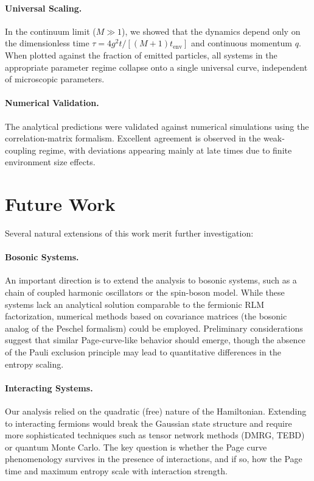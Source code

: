 \documentclass[12pt,oneside,openright]{report}
\theoremstyle{definition}
\theoremstyle{plain}
\theoremstyle{remark}
\begin{document}
\paragraph{Universal Scaling.}
In the continuum limit ($M \gg 1$), we showed that the dynamics depend only on the dimensionless time $\tau = 4g^2 t / [(M+1) t_{\mathrm{env}}]$ and continuous momentum $q$. When plotted against the fraction of emitted particles, all systems in the appropriate parameter regime collapse onto a single universal curve, independent of microscopic parameters.

\paragraph{Numerical Validation.}
The analytical predictions were validated against numerical simulations using the correlation-matrix formalism.
Excellent agreement is observed in the weak-coupling regime, with deviations appearing mainly at late times due to finite environment size effects.

\section{Future Work}
\label{sec:future_work}

Several natural extensions of this work merit further investigation:

\paragraph{Bosonic Systems.}
An important direction is to extend the analysis to bosonic systems, such as a chain of coupled harmonic oscillators or the spin-boson model. While these systems lack an analytical solution comparable to the fermionic RLM factorization, numerical methods based on covariance matrices (the bosonic analog of the Peschel formalism) could be employed. Preliminary considerations suggest that similar Page-curve-like behavior should emerge, though the absence of the Pauli exclusion principle may lead to quantitative differences in the entropy scaling.

\paragraph{Interacting Systems.}
Our analysis relied on the quadratic (free) nature of the Hamiltonian. Extending to interacting fermions would break the Gaussian state structure and require more sophisticated techniques such as tensor network methods (DMRG, TEBD) or quantum Monte Carlo. The key question is whether the Page curve phenomenology survives in the presence of interactions, and if so, how the Page time and maximum entropy scale with interaction strength.
\end{document}
